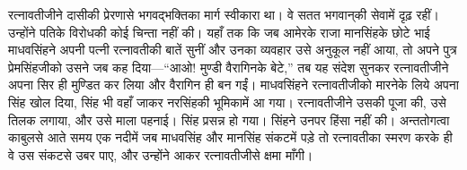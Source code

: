 \begin{sloppypar}\justifying{}
रत्नावतीजीने दासीकी प्रेरणासे भगवद्भक्तिका मार्ग स्वीकारा था। वे सतत भगवान्‌की सेवामें दृढ़ रहीं। उन्होंने पतिके विरोधकी कोई चिन्ता नहीं की। यहाँ तक कि जब आमेरके राजा मानसिंहके छोटे भाई माधवसिंहने अपनी पत्नी रत्नावतीकी बातें सुनीं और उनका व्यवहार उसे अनुकूल नहीं आया, तो अपने पुत्र प्रेमसिंहजीको उसने जब कह दिया—“आओ! मुण्डी वैरागिनके बेटे,” तब यह संदेश सुनकर रत्नावतीजीने अपना सिर ही मुण्डित कर लिया और वैरागिन ही बन गईं। माधवसिंहने रत्नावतीजीको मारनेके लिये अपना सिंह खोल दिया, सिंह भी वहाँ जाकर नरसिंहकी भूमिकामें आ गया। रत्नावतीजीने उसकी पूजा की, उसे तिलक लगाया, और उसे माला पहनाई। सिंह प्रसन्न हो गया। सिंहने उनपर हिंसा नहीं की। अन्ततोगत्वा काबुलसे आते समय एक नदीमें जब माधवसिंह और मानसिंह संकटमें पड़े तो रत्नावतीका स्मरण करके ही वे उस संकटसे उबर पाए, और उन्होंने आकर रत्नावतीजीसे क्षमा माँगी।
\end{sloppypar}


